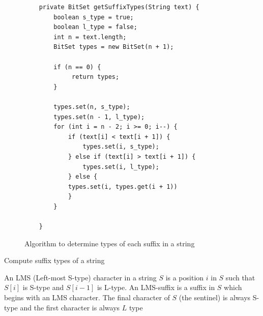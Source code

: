 \begin{figure}
	\begin{center}
		\begin{lstlisting}
    private BitSet getSuffixTypes(String text) {
        boolean s_type = true;
        boolean l_type = false;
        int n = text.length;
        BitSet types = new BitSet(n + 1);
        
        if (n == 0) {
             return types;
        }

        types.set(n, s_type);
        types.set(n - 1, l_type);
        for (int i = n - 2; i >= 0; i--) {
            if (text[i] < text[i + 1]) {
                types.set(i, s_type);
            } else if (text[i] > text[i + 1]) {
                types.set(i, l_type);
            } else {
            types.set(i, types.get(i + 1))
            }
        }

    }
\end{lstlisting}
	\end{center}
	\caption{Algorithm to determine types of each suffix in a string}
	\label{fig:sais-types}
\end{figure}

\begin{algorithm}[htp]
  \SetAlgoLined\DontPrintSemicolon

  \vspace{0.5cm}
  \caption{Compute suffix types of a string}
  \label{alg:suffixtypes}
\end{algorithm}


\begin{definition}

    An LMS (Left-most S-type) character in a string $S$ is a position $i$ in $S$ such that
    $S[i]$ is S-type and $S[i-1]$ is L-type. An LMS-suffix is a suffix in $S$ which begins
    with an LMS character. The final character of $S$ (the sentinel) is always S-type and
    the first character is always $L$ type

\end{definition}

